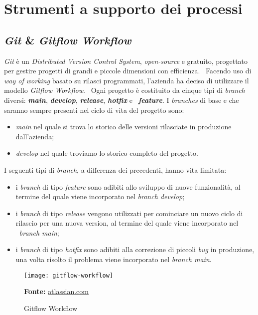 \section{Strumenti a supporto dei processi}

\subsection{\emph{Git} \& \emph{Gitflow Workflow}}
\emph{Git} è un \emph{Distributed Version Control System}, \emph{open-source} e gratuito, progettato per gestire progetti di grandi e piccole dimensioni con efficienza. \
Facendo uso di \emph{way of working} basato su rilasci programmati, l'azienda ha deciso di utilizzare il modello \emph{Gitflow Workflow}. \
Ogni progetto è costituito da cinque tipi di \emph{branch} diversi: \textbf{\emph{main}}, \textbf{\emph{develop}}, \textbf{\emph{release}}, \textbf{\emph{hotfix}} e \
\textbf{\emph{feature}}. I \emph{branches} di base e che saranno sempre presenti nel ciclo di vita del progetto sono:
\begin{itemize}
  \item \emph{main} nel quale si trova lo storico delle versioni rilasciate in produzione dall'azienda;
  \item \emph{develop} nel quale troviamo lo storico completo del progetto. 
\end{itemize}  

I seguenti tipi di \emph{branch}, a differenza dei precedenti, hanno vita limitata: \
\begin{itemize}
  \item i \emph{branch} di tipo \emph{feature} sono adibiti allo sviluppo di nuove funzionalità, al termine del quale viene incorporato nel \emph{branch develop}; 
  \item i \emph{branch} di tipo \emph{release} vengono utilizzati per cominciare un nuovo ciclo di rilascio per una nuova version, al termine del quale viene incorporato nel \
  \emph{branch main}; 
  \item i \emph{branch} di tipo \emph{hotfix} sono adibiti alla correzione di piccoli \emph{bug} in produzione, una volta risolto il problema viene incorporato nel \emph{branch main}.
\end{itemize}

\vspace{10pt}
  \begin{figure}[!ht]
    \begin{center}
      \texttt{[image: gitflow-workflow]}
      \caption{Gitflow Workflow}
      \textbf{Fonte:} \href{https://www.atlassian.com}{atlassian.com}
    \end{center}
  \end{figure}
\vspace{10pt} 

